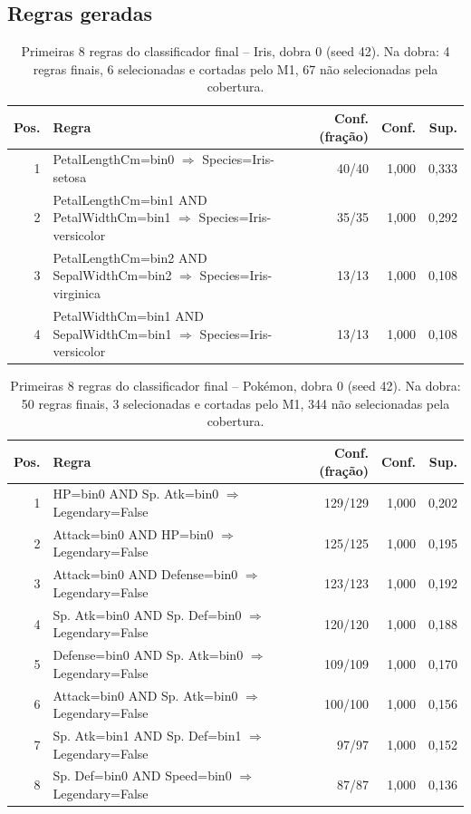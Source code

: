 \documentclass[a4paper,11pt]{article}
\begin{document}
\subsection{Regras geradas}
\begin{table}[htbp]
\centering
\small
\caption{Primeiras 8 regras do classificador final -- Iris, dobra 0 (seed 42). Na dobra: 4 regras finais, 6 selecionadas e cortadas pelo M1, 67 não selecionadas pela cobertura.}
\label{tab:regras_iris}
\begin{tabular}{rp{7.2cm}rrr}
\toprule
Pos. & Regra & Conf. (fração) & Conf. & Sup. \\
\midrule
1 & PetalLengthCm=bin0 $\Rightarrow$ Species=Iris-setosa & 40/40 & 1,000 & 0,333 \\
2 & PetalLengthCm=bin1 AND PetalWidthCm=bin1 $\Rightarrow$ Species=Iris-versicolor & 35/35 & 1,000 & 0,292 \\
3 & PetalLengthCm=bin2 AND SepalWidthCm=bin2 $\Rightarrow$ Species=Iris-virginica & 13/13 & 1,000 & 0,108 \\
4 & PetalWidthCm=bin1 AND SepalWidthCm=bin1 $\Rightarrow$ Species=Iris-versicolor & 13/13 & 1,000 & 0,108 \\
\bottomrule
\end{tabular}
\end{table}

\begin{table}[htbp]
\centering
\small
\caption{Primeiras 8 regras do classificador final -- Pokémon, dobra 0 (seed 42). Na dobra: 50 regras finais, 3 selecionadas e cortadas pelo M1, 344 não selecionadas pela cobertura.}
\label{tab:regras_pokemon}
\begin{tabular}{rp{7.2cm}rrr}
\toprule
Pos. & Regra & Conf. (fração) & Conf. & Sup. \\
\midrule
1 & HP=bin0 AND Sp. Atk=bin0 $\Rightarrow$ Legendary=False & 129/129 & 1,000 & 0,202 \\
2 & Attack=bin0 AND HP=bin0 $\Rightarrow$ Legendary=False & 125/125 & 1,000 & 0,195 \\
3 & Attack=bin0 AND Defense=bin0 $\Rightarrow$ Legendary=False & 123/123 & 1,000 & 0,192 \\
4 & Sp. Atk=bin0 AND Sp. Def=bin0 $\Rightarrow$ Legendary=False & 120/120 & 1,000 & 0,188 \\
5 & Defense=bin0 AND Sp. Atk=bin0 $\Rightarrow$ Legendary=False & 109/109 & 1,000 & 0,170 \\
6 & Attack=bin0 AND Sp. Atk=bin0 $\Rightarrow$ Legendary=False & 100/100 & 1,000 & 0,156 \\
7 & Sp. Atk=bin1 AND Sp. Def=bin1 $\Rightarrow$ Legendary=False & 97/97 & 1,000 & 0,152 \\
8 & Sp. Def=bin0 AND Speed=bin0 $\Rightarrow$ Legendary=False & 87/87 & 1,000 & 0,136 \\
\bottomrule
\end{tabular}
\end{table}
\end{document}
